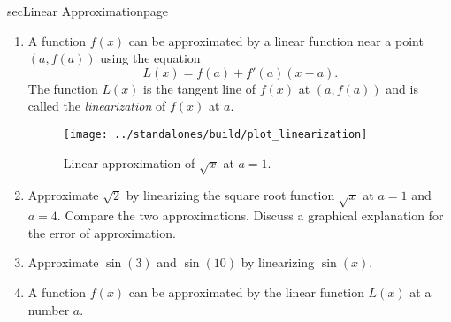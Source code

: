 \documentclass[../main]{subfiles}
\begin{document}
%
%
\begin{outline}{sec}{Linear Approximation}{page} \label{outline:linear_approx}
  \begin{enumerate}
    \item A function \(f(x)\) can be approximated by a linear function near a point \((a, f(a))\) using the equation
      \begin{equation} \label{eq:linearization}
        L(x) = f(a) + f'(a) (x-a).
      \end{equation}
      The function \(L(x)\) is the tangent line of \(f(x)\) at \((a,f(a))\) and is called the \emph{linearization} of \(f(x)\) at \(a\).
      \begin{figure}[h]
        \centering
        \texttt{[image: ../standalones/build/plot\_linearization]}
        \caption{Linear approximation of \(\sqrt{x}\) at \(a = 1\).}
        \label{fig:linearization-of-sqrt}
      \end{figure}
      
    \item Approximate \(\sqrt{2}\) by linearizing the square root function \(\sqrt{x}\) at \(a = 1\) and \(a = 4\).  Compare the two approximations.  Discuss a graphical explanation for the error of approximation.
    \item Approximate \(\sin(3)\) and \(\sin(10)\) by linearizing \(\sin(x)\).  
    \item {A function \(f(x)\) can be approximated by the linear function \(L(x)\) at a number \(a\).}
  \end{enumerate}
\end{outline}
\end{document}
